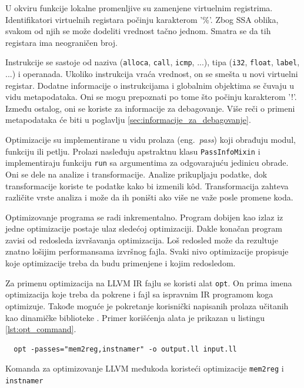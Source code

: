 \documentclass[12pt,oneside]{memoir}
\begin{document}
U okviru funkcije lokalne promenljive su zamenjene virtuelnim registrima.
Identifikatori virtuelnih registara počinju karakterom '\%'.
Zbog SSA oblika, svakom od njih se može dodeliti vrednost tačno jednom.
Smatra se da tih registara ima neograničen broj.

Instrukcije se sastoje od naziva (\verb|alloca|, \verb|call|, \verb|icmp|, ...), tipa (\verb|i32|, \verb|float|, \verb|label|, ...) i operanada.
Ukoliko instrukcija vraća vrednost, on se smešta u novi virtuelni registar.
Dodatne informacije o instrukcijama i globalnim objektima se čuvaju u vidu metapodataka.
Oni se mogu prepoznati po tome što počinju karakterom '!'.
Između ostalog, oni se koriste za informacije za debagovanje.
Više reči o primeni metapodataka će biti u poglavlju \ref{sec:informacije_za_debagovanje}.

Optimizacije su implementirane u vidu prolaza (eng.~{\em pass}) koji obrađuju modul, funkciju ili petlju.
Prolazi nasleđuju apstraktnu klasu \verb|PassInfoMixin| i implementiraju funkciju \verb|run| sa argumentima za odgovarajuću jedinicu obrade.
Oni se dele na analize i transformacije.
Analize prikupljaju podatke, dok transformacije koriste te podatke kako bi izmenili k\^od.
Transformacija zahteva različite vrste analiza i može da ih poništi ako više ne važe posle promene koda.

Optimizovanje programa se radi inkrementalno.
Program dobijen kao izlaz iz jedne optimizacije postaje ulaz sledećoj optimizaciji.
Dakle konačan program zavisi od redosleda izvršavanja optimizacija.
Loš redosled može da rezultuje znatno lošijim performansama izvršnog fajla.
Svaki nivo optimizacije propisuje koje optimizacije treba da budu primenjene i kojim redosledom.

Za primenu optimizacija na LLVM IR fajlu se koristi alat \verb|opt|.
On prima imena optimizacija koje treba da pokrene i fajl sa ispravnim IR programom koga optimizuje.
Takođe moguće je pokretanje korisnički napisanih prolaza učitanih kao dinamičke biblioteke \cite{pandey2017cookbook}.
Primer korišćenja alata je prikazan u listingu \ref{lst:opt_command}.
\begin{listing}[!ht]
\begin{verbatim}
  opt -passes="mem2reg,instnamer" -o output.ll input.ll
\end{verbatim}
\caption{Komanda za optimizovanje LLVM međukoda koristeći optimizacije \texttt{mem2reg} i \texttt{instnamer}}
\label{lst:opt_command}
\end{listing}
\end{document}

